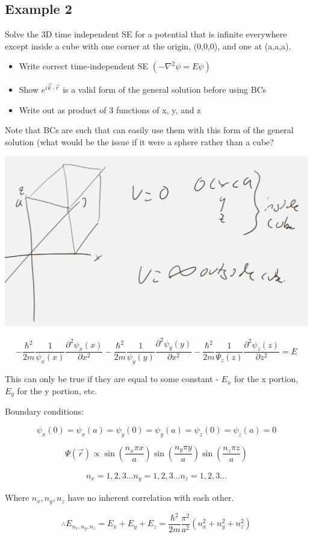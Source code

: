 \documentclass{article}
\begin{document}
\subsection{Example 2}

Solve the 3D time independent SE for a potential that is infinite everywhere except inside a cube with one corner at the origin, (0,0,0), and one at (a,a,a).


\begin{itemize}
    \item Write correct time-independent SE $(- \nabla^2 \psi = E\psi)$
    \item Show $e^{i \vec k \cdot \vec r}$ is a valid form of the general solution before using BCs
    \item Write out as product of 3 functions of x, y, and z
\end{itemize}

Note that BCs are such that can easily use them with this form of the general solution (what would be the issue if it were a sphere rather than a cube?


\includegraphics[width = 0.8 \textwidth]{Lecture18/3.png}

$$- \frac{\hbar^2}{2m} \frac{1}{\psi_x(x)} \frac{\partial^2 \psi_x(x)}{\partial x^2} - \frac{\hbar^2}{2m} \frac{1}{\psi_y(y)} \frac{\partial^2 \psi_y(y)}{\partial x^2}    - \frac{\hbar^2}{2m} \frac{1}{\Psi_z(z)} \frac{\partial^2 \psi_z(z)}{\partial z^2} = E$$

This can only be true if they are equal to some constant - $E_x$ for the x portion, $E_y$ for the y portion, etc. 

Boundary conditions:

$$\psi_x(0) = \psi_x(a) = \psi_y(0) = \psi_y(a) = \psi_z(0) = \psi_z(a) = 0$$

$$\Psi(\vec{r}) \propto \sin \left( \frac{n_x \pi x}{a} \right) \sin \left( \frac{n_y \pi y}{a} \right) \sin \left( \frac{n_z \pi z}{a} \right)$$

\begin{align*}
    n_x = 1,2,3...
    n_y = 1,2,3...
    n_z = 1,2,3...
\end{align*}

Where $n_x, n_y, n_z$ have no inherent correlation with each other. 

$$\therefore E_{n_x, n_y, n_z} = E_x + E_y + E_z = \frac{\hbar^2}{2m} \frac{\pi^2}{a^2} \left( n_x^2 + n_y^2 + n_z^2 \right)$$
\end{document}
